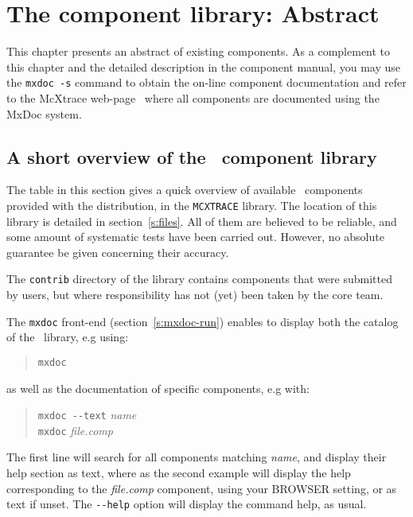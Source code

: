 \chapter{The component library: Abstract}
\label{s:components}

This chapter presents an abstract of existing components.
As a complement to this chapter and the
detailed description in the \MCX component manual,
you may use the \verb+mxdoc -s+ command to obtain the on-line
component documentation and refer to the McXtrace web-page~\cite{mcxtrace_webpage}
where all components are documented using the MxDoc system.

\section{A short overview of the \MCX\ component library}
\label{s:comp-overview}

The table in this section gives a quick overview of available \MCX\ components
provided with the distribution, in the \verb+MCXTRACE+ library. The
location of this library is detailed in section~\ref{s:files}.
All of them are believed to be reliable, and some amount of systematic
tests have been carried out.
However, no absolute guarantee be given concerning their accuracy.

The \verb+contrib+ directory of the library contains components
that were submitted by \MCX users,
but where responsibility has not (yet) been taken by the \MCX core team. 


The \verb+mxdoc+ front-end (section~\ref{s:mxdoc-run}) enables to display both the
catalog of the \MCX\ library, e.g using: 
\begin{quote}
  \verb|mxdoc|
\end{quote}
as well as the documentation of specific components, e.g with:
\begin{quote}
  \verb|mxdoc --text| \textit{name} \\
  \verb|mxdoc| \textit{file.comp}
\end{quote}
The first line will search for all components matching \textit{name}, and display their help section as text, where as the second example will display the help corresponding to the \textit{file.comp} component, using your BROWSER setting, or as text if unset. The \verb+--help+ option will display the command help, as usual.

